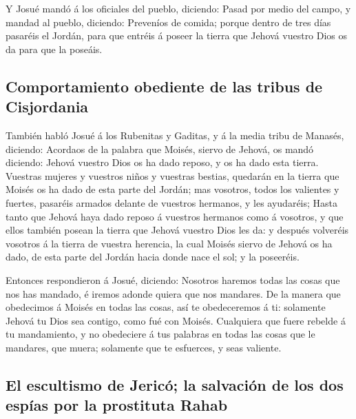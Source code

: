  Y Josué mandó á los oficiales del pueblo, diciendo:
 Pasad por medio del campo, y mandad al pueblo, diciendo:
Preveníos de comida; porque dentro de tres días pasaréis el Jordán, para
que entréis á poseer la tierra que Jehová vuestro Dios os da para que la
poseáis.

\hypertarget{comportamiento-obediente-de-las-tribus-de-cisjordania}{%
\subsection{Comportamiento obediente de las tribus de
Cisjordania}\label{comportamiento-obediente-de-las-tribus-de-cisjordania}}

 También habló Josué á los Rubenitas y Gaditas, y á la
media tribu de Manasés, diciendo:  Acordaos de la palabra
que Moisés, siervo de Jehová, os mandó diciendo: Jehová vuestro Dios os
ha dado reposo, y os ha dado esta tierra.  Vuestras mujeres
y vuestros niños y vuestras bestias, quedarán en la tierra que Moisés os
ha dado de esta parte del Jordán; mas vosotros, todos los valientes y
fuertes, pasaréis armados delante de vuestros hermanos, y les ayudaréis;
 Hasta tanto que Jehová haya dado reposo á vuestros
hermanos como á vosotros, y que ellos también posean la tierra que
Jehová vuestro Dios les da: y después volveréis vosotros á la tierra de
vuestra herencia, la cual Moisés siervo de Jehová os ha dado, de esta
parte del Jordán hacia donde nace el sol; y la poseeréis.

 Entonces respondieron á Josué, diciendo: Nosotros haremos
todas las cosas que nos has mandado, é iremos adonde quiera que nos
mandares.  De la manera que obedecimos á Moisés en todas
las cosas, así te obedeceremos á ti: solamente Jehová tu Dios sea
contigo, como fué con Moisés.  Cualquiera que fuere rebelde
á tu mandamiento, y no obedeciere á tus palabras en todas las cosas que
le mandares, que muera; solamente que te esfuerces, y seas valiente.

\hypertarget{el-escultismo-de-jericuxf3-la-salvaciuxf3n-de-los-dos-espuxedas-por-la-prostituta-rahab}{%
\subsection{El escultismo de Jericó; la salvación de los dos espías por
la prostituta
Rahab}\label{el-escultismo-de-jericuxf3-la-salvaciuxf3n-de-los-dos-espuxedas-por-la-prostituta-rahab}}

